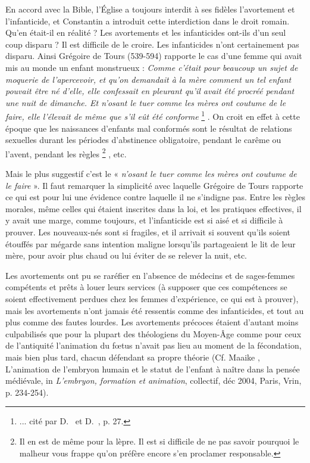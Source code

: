  En accord avec la Bible, l'Église a toujours interdit à ses fidèles l'avortement et l'infanticide, et Constantin a introduit cette interdiction dans le droit romain. Qu'en était-il en réalité ? Les avortements et les infanticides ont-ils d'un seul coup disparu ? Il est difficile de le croire. Les infanticides n'ont certainement pas disparu. Ainsi Grégoire de Tours (539-594) rapporte le cas d'une femme qui avait mis au monde un enfant monstrueux : \emph{Comme c'était pour beaucoup un sujet de moquerie de l'apercevoir, et qu'on demandait à la mère comment un tel enfant pouvait être né d'elle, elle confessait en pleurant qu'il avait été procréé pendant une nuit de dimanche. Et n'osant le tuer comme les mères ont coutume de le faire, elle l'élevait de même que s'il eût été conforme}%
\footnote{... cité par D.~ et D.~, p. 27.}%
. On croit en effet à cette époque que les naissances d'enfants mal conformés sont le résultat de relations sexuelles durant les périodes d'abstinence obligatoire, pendant le carême ou l'avent, pendant les règles%
\footnote{Il en est de même pour la lèpre. Il est si difficile de ne pas savoir pourquoi le malheur vous frappe qu'on préfère encore s'en proclamer responsable.}%
, etc.

 Mais le plus suggestif c'est le « \emph{n'osant le tuer comme les mères ont coutume de le faire} ». Il faut remarquer la simplicité avec laquelle Grégoire de Tours rapporte ce qui est pour lui une évidence contre laquelle il ne s'indigne pas. Entre les règles morales, même celles qui étaient inscrites dans la loi, et les pratiques effectives, il y avait une marge, comme toujours, et l'infanticide est si aisé et si difficile à prouver. Les nouveaux-nés sont si fragiles, et il arrivait si souvent qu'ils soient étouffés par mégarde sans intention maligne lorsqu'ils partageaient le lit de leur mère, pour avoir plus chaud ou lui éviter de se relever la nuit, etc. 

 Les avortements ont pu se raréfier en l'absence de médecins et de sages-femmes compétents et prêts à louer leurs services (à supposer que ces compétences se soient effectivement perdues chez les femmes d'expérience, ce qui est à prouver), mais les avortements n'ont jamais été ressentis comme des infanticides, et tout au plus comme des fautes lourdes. Les avortements précoces étaient d'autant moins culpabilisés que pour la plupart des théologiens du Moyen-Âge comme pour ceux de l'antiquité l'animation du fœtus n'avait pas lieu au moment de la fécondation, mais bien plus tard, chacun défendant sa propre théorie (Cf. Maaike , L'animation de l'embryon humain et le statut de l'enfant à naître dans la pensée médiévale, in \emph{L'embryon, formation et animation}, collectif, déc 2004, Paris, Vrin, p. 234-254). 

